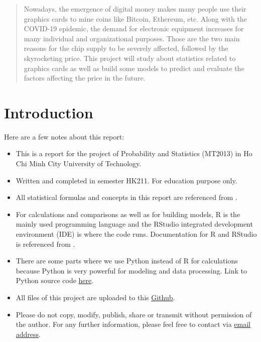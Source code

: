 \documentclass[a4paper]{article}
\begin{document}

\newpage
\tableofcontents
\newpage


\begin{abstract}
    Nowadays, the emergence of digital money makes many people use their graphics cards to mine coins like Bitcoin, Ethereum, etc. Along with the COVID-19 epidemic, the demand for electronic equipment increases for many individual and organizational purposes. Those are the two main reasons for the chip supply to be severely affected, followed by the skyrocketing price. This project will study about statistics related to graphics cards as well as build some models to predict and evaluate the factors affecting the price in the future.
\end{abstract}

\section{Introduction}
Here are a few notes about this report:
\begin{itemize}
    \item This is a report for the project of Probability and Statistics (MT2013) in Ho Chi Minh City University of Technology.
    \item Written and completed in semester HK211. For education purpose only.
    \item All statistical formulas and concepts in this report are referenced from \cite{bib1, bib2, bib3}.
    \item For calculations and comparisons as well as for building models, R is the mainly used programming language and the RStudio integrated development environment (IDE) is where the code runs. Documentation for R and RStudio is referenced from \cite{bib12}.
    \item There are some parts where we use Python instead of R for calculations because Python is very powerful for modeling and data processing. Link to Python source code \href{https://colab.research.google.com/drive/1ixVXEsUy2YtcCrayuPR6mmMf80pT92nh?usp=sharing}{here}.
    \item All files of this project are uploaded to this \href{https://github.com/CSEK19/prob-stat}{Github}.
    \item Please do not copy, modify, publish, share or transmit without permission of the author. For any further information, please feel free to contact via \href{mailto:phat.tran.k19@hcmut.edu.vn}{email address}.
\end{itemize}
\end{document}
